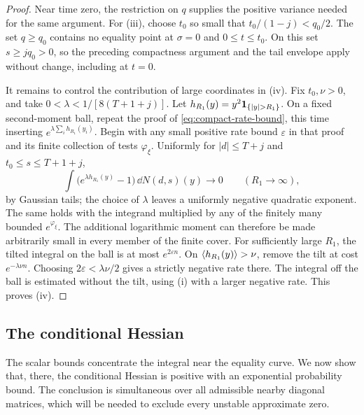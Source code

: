 \begin{proof}
Near time zero, the restriction on $q$ supplies the positive variance
needed for the same argument. For \textup{(iii)}, choose $t_0$ so small that
$t_0/(1-j)<q_0/2$.  The set $q\ge q_0$ contains no equality point at
$\sigma=0$ and $0\le t\le t_0$.  On this set $s\ge jq_0>0$, so the
preceding compactness argument and the tail envelope apply without
change, including at $t=0$.

It remains to control the contribution of large coordinates in
\textup{(iv)}. Fix $t_0,\nu>0$, and take
$0<\lambda<1/[8(T+1+j)]$.  Let
$h_{R_1}(y)=y^2\one_{\{|y|>R_1\}}$.  On a fixed second-moment ball,
repeat the proof of \eqref{eq:compact-rate-bound}, this time inserting
$e^{\lambda\sum_i h_{R_1}(y_i)}$.  Begin with any small positive rate
bound $\varepsilon$ in that proof and its finite collection of tests
$\varphi_\xi$.  Uniformly for $|d|\le T+j$ and
$t_0\le s\le T+1+j$,
\[
 \int\bigl(e^{\lambda h_{R_1}(y)}-1\bigr)\,\dd N(d,s)(y)
 \longrightarrow0\qquad(R_1\to\infty),
\]
by Gaussian tails; the choice of $\lambda$ leaves a uniformly negative
quadratic exponent.  The same holds with the integrand multiplied by
any of the finitely many bounded $e^{\varphi_\xi}$. The additional
logarithmic moment can therefore be made arbitrarily
small in every member of the finite cover. For sufficiently large $R_1$,
the tilted integral on the ball is at most $e^{2\varepsilon n}$.  On
$\langle h_{R_1}(y)\rangle>\nu$, remove the tilt at cost
$e^{-\lambda\nu n}$.  Choosing $2\varepsilon<\lambda\nu/2$ gives a
strictly negative rate there.  The integral off the ball is estimated
without the tilt, using \textup{(i)} with a larger negative rate.
This proves \textup{(iv)}.
\end{proof}

\subsection{The conditional Hessian}

The scalar bounds concentrate the integral near the equality curve.
We now show that, there, the conditional Hessian is positive
with an exponential probability bound. The conclusion is simultaneous
over all admissible nearby diagonal matrices, which will be needed to
exclude every unstable approximate zero.

